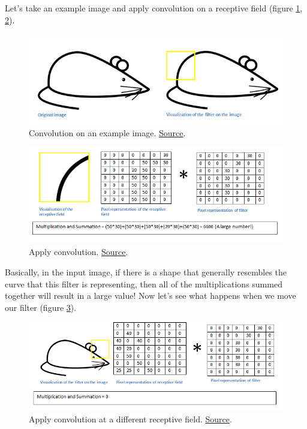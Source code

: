 \documentclass[a4paper]{tufte-handout}
\begin{document}
Let's take an example image and apply convolution on a receptive field (figure \ref{fig:conv2}, \ref{fig:conv3}).

\begin{figure}[!htb]
   \includegraphics[width=\linewidth]{conv_example2.png}
   \caption{Convolution on an example image.
            \href{https://adeshpande3.github.io/adeshpande3.github.io/A-Beginner's-Guide-To-Understanding-Convolutional-Neural-Networks/}{Source}.
}
	\label{fig:conv2}
\end{figure}

\begin{figure}[!htb]
   \includegraphics[width=\linewidth]{conv_example3.png}
   \caption{Apply convolution.
    \href{https://adeshpande3.github.io/adeshpande3.github.io/A-Beginner's-Guide-To-Understanding-Convolutional-Neural-Networks/}{Source}.
\label{fig:conv3}
}
\end{figure}

Basically, in the input image, if there is a shape that generally
resembles the curve that this filter is representing, then all of the
multiplications summed together will result in a large value! Now let's
see what happens when we move our filter (figure \ref{fig:conv4}).

\begin{figure}[!htb]
\includegraphics[width=\linewidth]{conv_example4.png}
\caption{Apply convolution at a different receptive field.
\href{https://adeshpande3.github.io/adeshpande3.github.io/A-Beginner's-Guide-To-Understanding-Convolutional-Neural-Networks/}{Source}.
}
\label{fig:conv4}
\end{figure}
\end{document}
